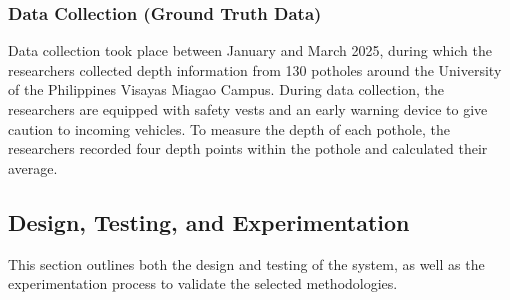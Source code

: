 \subsubsection{Data Collection (Ground Truth Data)}
Data collection took place between January and March 2025, during which the researchers collected depth information from 130 potholes around the University of the Philippines Visayas Miagao Campus. During data collection, the researchers are equipped with safety vests and an early warning device to give caution to incoming vehicles. To measure the depth of each pothole, the researchers recorded four depth points within the pothole and calculated their average.




\subsection{Design, Testing, and Experimentation}
This section outlines both the design and testing of the system, as well as the experimentation process to validate the selected methodologies. 

